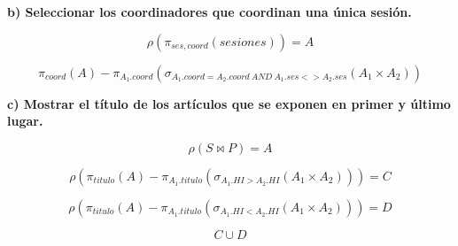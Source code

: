 \documentclass[a4paper,11pt]{article}
\begin{document}
\textbf{b) Seleccionar los coordinadores que coordinan una única sesión.}

\begin{equation*}
\rho(\pi_{ses,coord}(sesiones))=A
\end{equation*}

\begin{equation*}
\pi_{coord}(A)-\pi_{A_1.coord}(\sigma_{A_1.coord=A_2.coord\> AND \> A_1.ses<>A_2.ses}(A_1\times A_2))
\end{equation*}

\textbf{c) Mostrar el título de los artículos que se exponen en primer y último lugar.}

\begin{equation}
\rho(S\Join P)=A
\end{equation}

\begin{equation*}
\rho(\pi_{titulo}(A)-\pi_{A_1.titulo}(\sigma_{A_1.HI>A_2.HI}(A_1\times A_2)))=C
\end{equation*}

\begin{equation*}
\rho(\pi_{titulo}(A)-\pi_{A_1.titulo}(\sigma_{A_1.HI<A_2.HI}(A_1\times A_2)))=D
\end{equation*}

\begin{equation*}
C\cup D
\end{equation*}
\end{document}
